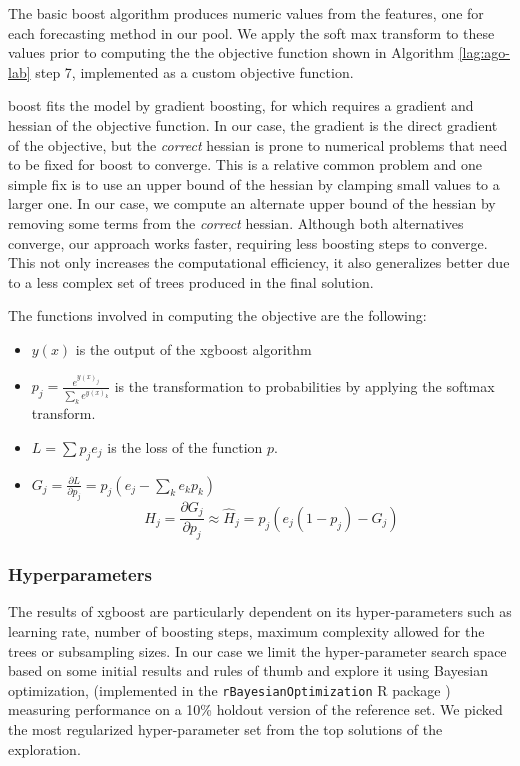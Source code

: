 \documentclass[11pt,a4paper,]{article}
\providecommand{\tightlist}{%
  \setlength{\itemsep}{0pt}\setlength{\parskip}{0pt}}
\theoremstyle{definition}
\theoremstyle{definition}
\theoremstyle{definition}
\theoremstyle{remark}
\begin{document}
The basic boost algorithm produces numeric values from the features, one
for each forecasting method in our pool. We apply the soft max transform
to these values prior to computing the the objective function shown in
Algorithm \ref{lag:ago-lab} step 7, implemented as a custom objective
function.

boost fits the model by gradient boosting, for which requires a gradient
and hessian of the objective function. In our case, the gradient is the
direct gradient of the objective, but the \emph{correct} hessian is
prone to numerical problems that need to be fixed for boost to converge.
This is a relative common problem and one simple fix is to use an upper
bound of the hessian by clamping small values to a larger one. In our
case, we compute an alternate upper bound of the hessian by removing
some terms from the \emph{correct} hessian. Although both alternatives
converge, our approach works faster, requiring less boosting steps to
converge. This not only increases the computational efficiency, it also
generalizes better due to a less complex set of trees produced in the
final solution.

The functions involved in computing the objective are the following:

\begin{itemize}
\tightlist
\item
  \(y(x)\) is the output of the xgboost algorithm
\item
  \(p_j = \frac{e^{y(x)_j}}{ \sum_k e^{y(x)_k}}\) is the transformation
  to probabilities by applying the softmax transform.
\item
  \(L = \sum p_j e_j\) is the loss of the function \(p\).
\item
  \(G_j = \frac{\partial{L}}{\partial{p_j}} = p_j(e_j -\sum_k e_kp_k)\)
  \[ H_j = \frac{\partial{G_j}}{\partial{p_j}} \approx \hat{H}_j = p_j(e_j(1-p_j) - G_j)  \]
\end{itemize}

\subsubsection{Hyperparameters}\label{hyperparameters}

The results of xgboost are particularly dependent on its
hyper-parameters such as learning rate, number of boosting steps,
maximum complexity allowed for the trees or subsampling sizes. In our
case we limit the hyper-parameter search space based on some initial
results and rules of thumb and explore it using Bayesian optimization,
(implemented in the \texttt{rBayesianOptimization} R package
\autocite{rBayesianOptimization}) measuring performance on a 10\%
holdout version of the reference set. We picked the most regularized
hyper-parameter set from the top solutions of the exploration.
\end{document}
